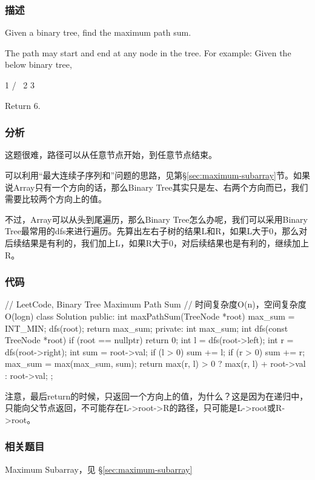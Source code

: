 \subsubsection{描述}
Given a binary tree, find the maximum path sum.

The path may start and end at any node in the tree.
For example:
Given the below binary tree,
\begin{Code}
  1
 / \
2   3
\end{Code}
Return $6$.


\subsubsection{分析}
这题很难，路径可以从任意节点开始，到任意节点结束。

可以利用“最大连续子序列和”问题的思路，见第\S \ref{sec:maximum-subarray}节。如果说Array只有一个方向的话，那么Binary Tree其实只是左、右两个方向而已，我们需要比较两个方向上的值。

不过，Array可以从头到尾遍历，那么Binary Tree怎么办呢，我们可以采用Binary Tree最常用的dfs来进行遍历。先算出左右子树的结果L和R，如果L大于0，那么对后续结果是有利的，我们加上L，如果R大于0，对后续结果也是有利的，继续加上R。

\subsubsection{代码}

\begin{Code}
// LeetCode, Binary Tree Maximum Path Sum
// 时间复杂度O(n)，空间复杂度O(logn)
class Solution {
public:
    int maxPathSum(TreeNode *root) {
        max_sum = INT_MIN;
        dfs(root);
        return max_sum;
    }
private:
    int max_sum;
    int dfs(const TreeNode *root) {
        if (root == nullptr) return 0;
        int l = dfs(root->left);
        int r = dfs(root->right);
        int sum = root->val;
        if (l > 0) sum += l;
        if (r > 0) sum += r;
        max_sum = max(max_sum, sum);
        return max(r, l) > 0 ? max(r, l) + root->val : root->val;
    }
};
\end{Code}

注意，最后return的时候，只返回一个方向上的值，为什么？这是因为在递归中，只能向父节点返回，不可能存在L->root->R的路径，只可能是L->root或R->root。


\subsubsection{相关题目}
\begindot
\item Maximum Subarray，见 \S \ref{sec:maximum-subarray}
\myenddot


